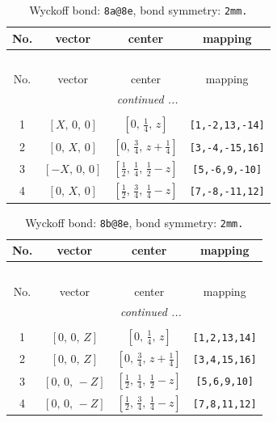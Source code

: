 \documentclass[fleqn,8pt]{jsarticle}
\begin{document}
\begin{longtable}{cccc}
\caption{Wyckoff bond: {\tt 8a@8e}, bond symmetry: {\tt 2mm.}}
 \\
 \hline \hline
No. & vector & center & mapping \\ \hline \endfirsthead

\multicolumn{3}{l}{\tablename\ \thetable{}} \\
 \hline \hline
No. & vector & center & mapping \\ \hline \endhead

 \hline \hline
\multicolumn{3}{r}{\footnotesize\it continued ...} \\ \endfoot

 \hline \hline
\multicolumn{3}{r}{} \\ \endlastfoot

1 & $\left[ X,\, 0,\, 0 \right]$ & $\left[ 0,\, \frac{1}{4},\, z \right]$ & {\tt [1,-2,13,-14]} \\ \hline
2 & $\left[ 0,\, X,\, 0 \right]$ & $\left[ 0,\, \frac{3}{4},\, z + \frac{1}{4} \right]$ & {\tt [3,-4,-15,16]} \\ \hline
3 & $\left[ - X,\, 0,\, 0 \right]$ & $\left[ \frac{1}{2},\, \frac{1}{4},\, \frac{1}{2} - z \right]$ & {\tt [5,-6,9,-10]} \\ \hline
4 & $\left[ 0,\, X,\, 0 \right]$ & $\left[ \frac{1}{2},\, \frac{3}{4},\, \frac{1}{4} - z \right]$ & {\tt [7,-8,-11,12]} \\
\end{longtable}
\renewcommand{\arraystretch}{1.2}
\begin{longtable}{cccc}
\caption{Wyckoff bond: {\tt 8b@8e}, bond symmetry: {\tt 2mm.}}
 \\
 \hline \hline
No. & vector & center & mapping \\ \hline \endfirsthead

\multicolumn{3}{l}{\tablename\ \thetable{}} \\
 \hline \hline
No. & vector & center & mapping \\ \hline \endhead

 \hline \hline
\multicolumn{3}{r}{\footnotesize\it continued ...} \\ \endfoot

 \hline \hline
\multicolumn{3}{r}{} \\ \endlastfoot

1 & $\left[ 0,\, 0,\, Z \right]$ & $\left[ 0,\, \frac{1}{4},\, z \right]$ & {\tt [1,2,13,14]} \\ \hline
2 & $\left[ 0,\, 0,\, Z \right]$ & $\left[ 0,\, \frac{3}{4},\, z + \frac{1}{4} \right]$ & {\tt [3,4,15,16]} \\ \hline
3 & $\left[ 0,\, 0,\, - Z \right]$ & $\left[ \frac{1}{2},\, \frac{1}{4},\, \frac{1}{2} - z \right]$ & {\tt [5,6,9,10]} \\ \hline
4 & $\left[ 0,\, 0,\, - Z \right]$ & $\left[ \frac{1}{2},\, \frac{3}{4},\, \frac{1}{4} - z \right]$ & {\tt [7,8,11,12]} \\
\end{longtable}
\end{document}
